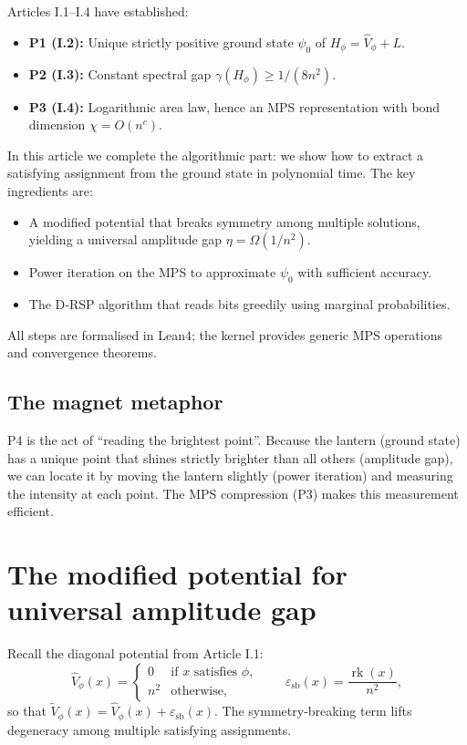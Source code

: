 \documentclass[11pt,a4paper]{article}
\begin{document}
Articles I.1–I.4 have established:
\begin{itemize}
\item \textbf{P1 (I.2):} Unique strictly positive ground state \(\psi_0\) of \(H_\phi = \hat{V}_\phi + L\).
\item \textbf{P2 (I.3):} Constant spectral gap \(\gamma(H_\phi) \ge 1/(8n^2)\).
\item \textbf{P3 (I.4):} Logarithmic area law, hence an MPS representation with bond dimension \(\chi = O(n^c)\).
\end{itemize}
In this article we complete the algorithmic part: we show how to extract a satisfying assignment from the ground state in polynomial time. The key ingredients are:
\begin{itemize}
\item A modified potential that breaks symmetry among multiple solutions, yielding a universal amplitude gap \(\eta = \Omega(1/n^2)\).
\item Power iteration on the MPS to approximate \(\psi_0\) with sufficient accuracy.
\item The D‑RSP algorithm that reads bits greedily using marginal probabilities.
\end{itemize}
All steps are formalised in Lean4; the kernel provides generic MPS operations and convergence theorems.

\subsection{The magnet metaphor}

P4 is the act of “reading the brightest point”. Because the lantern (ground state) has a unique point that shines strictly brighter than all others (amplitude gap), we can locate it by moving the lantern slightly (power iteration) and measuring the intensity at each point. The MPS compression (P3) makes this measurement efficient.

\section{The modified potential for universal amplitude gap}

Recall the diagonal potential from Article I.1:
\[
\hat{V}_\phi(x) = 
\begin{cases}
0 & \text{if } x \text{ satisfies } \phi,\\
n^2 & \text{otherwise},
\end{cases}
\qquad
\varepsilon_{\text{sb}}(x) = \frac{\operatorname{rk}(x)}{n^2},
\]
so that \(\tilde{V}_\phi(x) = \hat{V}_\phi(x) + \varepsilon_{\text{sb}}(x)\). The symmetry‑breaking term lifts degeneracy among multiple satisfying assignments.
\end{document}
